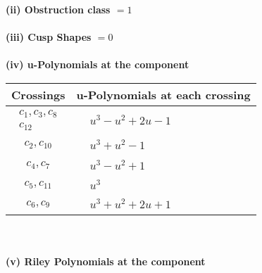\documentclass[1p]{elsarticle_modified}
\theoremstyle{definition}
\begin{document}
\flushleft \textbf{(ii) Obstruction class $= 1$}\\~\\
\flushleft \textbf{(iii) Cusp Shapes $= 0$}\\~\\
\newpage\renewcommand{\arraystretch}{1}
\flushleft \textbf{(iv) u-Polynomials at the component}\newline \\
\begin{tabular}{m{50pt}|m{274pt}}
Crossings & \hspace{64pt}u-Polynomials at each crossing \\
\hline $$\begin{aligned}c_{1},c_{3},c_{8}\\c_{12}\end{aligned}$$&$\begin{aligned}
&u^3- u^2+2 u-1
\end{aligned}$\\
\hline $$\begin{aligned}c_{2},c_{10}\end{aligned}$$&$\begin{aligned}
&u^3+u^2-1
\end{aligned}$\\
\hline $$\begin{aligned}c_{4},c_{7}\end{aligned}$$&$\begin{aligned}
&u^3- u^2+1
\end{aligned}$\\
\hline $$\begin{aligned}c_{5},c_{11}\end{aligned}$$&$\begin{aligned}
&u^3
\end{aligned}$\\
\hline $$\begin{aligned}c_{6},c_{9}\end{aligned}$$&$\begin{aligned}
&u^3+u^2+2 u+1
\end{aligned}$\\
\hline
\end{tabular}\\~\\
\newpage\renewcommand{\arraystretch}{1}
\flushleft \textbf{(v) Riley Polynomials at the component}\newline \\
\end{document}
